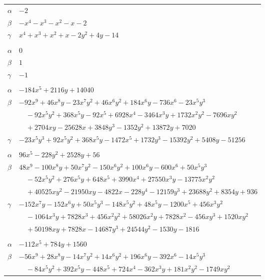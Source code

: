\documentclass[11pt]{article}
\begin{document}
\begin{longtable}{@{}ll@{}}
$\alpha$ & $-2$\\
$\beta$ & $-x^{4}-x^{3}-x^{2}-x-2$\\
$\gamma$ & $x^{4}+x^{3}+x^{2}+x-2y^{2}+4y-14$\\
\addlinespace[3pt]
\multicolumn{2}{@{}l}{$\{i,j\}=\{6,19\}$, $k_{ij}=2$}\\
$\alpha$ & $0$\\
$\beta$ & $1$\\
$\gamma$ & $-1$\\
\addlinespace[3pt]
\multicolumn{2}{@{}l}{$\{i,j\}=\{6,20\}$, $k_{ij}=2^{3}\cdot 3^{3}\cdot 5\cdot 13$}\\
$\alpha$ & $-184x^{5}+2116y+14040$\\
$\beta$ & $-92x^{9}+46x^{8}y-23x^{7}y^{2}+46x^{6}y^{2}+184x^{6}y-736x^{6}-23x^{5}y^{3}$\\
 & $\quad -92x^{5}y^{2}+368x^{5}y-92x^{5}+6928x^{4}-3464x^{3}y+1732x^{2}y^{2}-7696xy^{2}$\\
 & $\quad +2704xy-25628x+3848y^{3}-1352y^{2}+13872y+7020$\\
$\gamma$ & $-23x^{5}y^{3}+92x^{5}y^{2}+368x^{5}y-1472x^{5}+1732y^{3}-15392y^{2}+5408y-51256$\\
\addlinespace[3pt]
\multicolumn{2}{@{}l}{$\{i,j\}=\{6,22\}$, $k_{ij}=2^{3}\cdot 7$}\\
$\alpha$ & $96x^{5}-228y^{2}+2528y+56$\\
$\beta$ & $48x^{9}-100x^{8}y+50x^{7}y^{2}-150x^{6}y^{2}+100x^{6}y-600x^{6}+50x^{5}y^{3}$\\
 & $\quad -52x^{5}y^{2}+276x^{5}y+648x^{5}+3990x^{4}+27550x^{3}y-13775x^{2}y^{2}$\\
 & $\quad +40525xy^{2}-21950xy-4822x-228y^{4}-12159y^{3}+23688y^{2}+8354y+936$\\
$\gamma$ & $-152x^{7}y-152x^{6}y+50x^{5}y^{3}-148x^{5}y^{2}+48x^{5}y-1200x^{5}+456x^{3}y^{2}$\\
 & $\quad -1064x^{3}y+7828x^{3}+456x^{2}y^{2}+58026x^{2}y+7828x^{2}-456xy^{3}+1520xy^{2}$\\
 & $\quad +50198xy+7828x-14687y^{3}+24544y^{2}-1530y-1816$\\
\addlinespace[3pt]
\multicolumn{2}{@{}l}{$\{i,j\}=\{6,23\}$, $k_{ij}=2^{3}\cdot 3\cdot 5\cdot 13$}\\
$\alpha$ & $-112x^{5}+784y+1560$\\
$\beta$ & $-56x^{9}+28x^{8}y-14x^{7}y^{2}+14x^{6}y^{2}+196x^{6}y-392x^{6}-14x^{5}y^{3}$\\
 & $\quad -84x^{5}y^{2}+392x^{5}y-448x^{5}+724x^{4}-362x^{3}y+181x^{2}y^{2}-1749xy^{2}$\\

\end{longtable}
\end{document}
